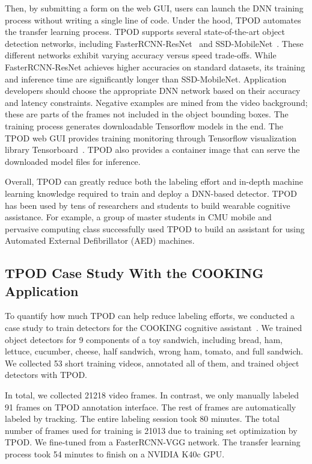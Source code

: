 Then, by submitting a form on the web GUI, users can launch the DNN training
process without writing a single line of code. Under the hood, TPOD automates
the transfer learning process. TPOD supports several state-of-the-art object
detection networks, including FasterRCNN-ResNet~\cite{ren2015faster,He2016} and
SSD-MobileNet~\cite{Liu2016,Howard2017}. These different networks exhibit
varying accuracy versus speed trade-offs. While FasterRCNN-ResNet achieves higher
accuracies on standard datasets, its training and inference time are
significantly longer than SSD-MobileNet. Application developers should choose
the appropriate DNN network based on their accuracy and latency constraints.
Negative examples are mined from the video background; these are parts of the
frames not included in the object bounding boxes.  The training process
generates downloadable Tensorflow models in the end. The TPOD web GUI provides
training monitoring through Tensorflow visualization library
Tensorboard~\cite{tensorflow2017}. TPOD also provides a container image that can
serve the downloaded model files for inference.

Overall, TPOD can greatly reduce both the labeling effort and in-depth machine
learning knowledge required to train and deploy a DNN-based detector. TPOD has
been used by tens of researchers and students to build wearable cognitive
assistance. For example, a group of master students in CMU mobile and pervasive
computing class successfully used TPOD to build an assistant for using Automated
External Defibrillator (AED) machines.

\subsection{TPOD Case Study With the COOKING Application}

To quantify how much TPOD can help reduce labeling efforts, we conducted a case
study to train detectors for the COOKING cognitive
assistant~\cite{chen2018application}. We trained object detectors for 9
components of a toy sandwich, including bread, ham, lettuce, cucumber, cheese,
half sandwich, wrong ham, tomato, and full sandwich. We collected 53 short
training videos, annotated all of them, and trained object detectors with TPOD.

In total, we collected 21218 video frames. In contrast, we only manually labeled
91 frames on TPOD annotation interface. The rest of frames are automatically
labeled by tracking. The entire labeling session took 80 minutes. The total
number of frames used for training is 21013 due to training set optimization by
TPOD. We fine-tuned from a FasterRCNN-VGG network. The transfer learning process
took 54 minutes to finish on a NVIDIA K40c GPU.


